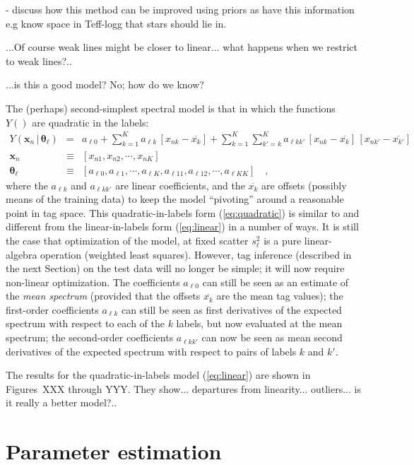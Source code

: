 \documentclass[12pt, preprint]{aastex}
\newcommand{\set}[1]{\bm{#1}}
\newcommand{\mean}[1]{\overline{#1}}
\newcommand{\given}{\,|\,}
\begin{document}
- discuss how this method can be improved using priors as have this information e.g know space in Teff-logg that stars should lie in. 

...Of course weak lines might be closer to linear... what happens when
we restrict to weak lines?..

...is this a good model?  No; how do we know?

The (perhaps) second-simplest spectral model is that in which the
functions $Y()$ are quadratic in the labels:
\begin{eqnarray}
Y(\set{x}_n\given\set{\theta}_\ell) &=&
 a_{\ell 0} + \sum_{k=1}^K a_{\ell k}\,[x_{nk} - \mean{x_k}]
 + \sum_{k=1}^K \sum_{k'=k}^K a_{\ell kk'}\,[x_{nk} - \mean{x_k}]\,[x_{nk'} - \mean{x_{k'}}]
\label{eq:quadratic}\\
\set{x}_n &\equiv& [x_{n1}, x_{n2}, \cdots, x_{nK}]
\\
\set{\theta}_\ell &\equiv& [a_{\ell 0}, a_{\ell 1}, \cdots, a_{\ell K},
                            a_{\ell 11}, a_{\ell 12}, \cdots, a_{\ell KK}]
\quad ,
\end{eqnarray}
where the $a_{\ell k}$ and $a_{\ell kk'}$ are linear coefficients, and
the $\mean{x_k}$ are offsets (possibly means of the training data) to
keep the model ``pivoting'' around a reasonable point in tag space.
This quadratic-in-labels form (\ref{eq:quadratic}) is similar to and
different from the linear-in-labels form (\ref{eq:linear}) in a number
of ways.
It is still the case that optimization of the model, at fixed scatter
$s_\ell^2$ is a pure linear-algebra operation (weighted least
squares).
However, tag inference (described in the next Section) on the test
data will no longer be simple; it will now require non-linear
optimization.
The coefficients $a_{\ell 0}$ can still be seen as an estimate of the
\emph{mean spectrum} (provided that the offsets $\mean{x_k}$ are the
mean tag values); the first-order coefficients $a_{\ell k}$ can still
be seen as first derivatives of the expected spectrum with respect to
each of the $k$ labels, but now evaluated at the mean spectrum; the
second-order coefficients $a_{\ell kk'}$ can now be seen as mean
second derivatives of the expected spectrum with respect to pairs of
labels $k$ and $k'$.

The results for the quadratic-in-labels model (\ref{eq:linear}) are shown
in Figures~XXX through YYY.  They show... departures from
linearity... outliers... is it really a better model?..

\section{Parameter estimation}
\end{document}
